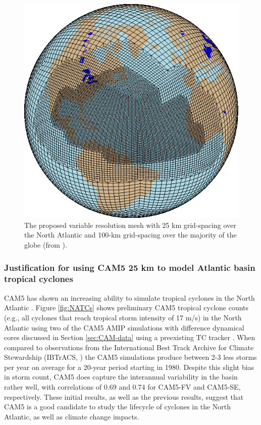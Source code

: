 \documentclass[11pt]{article}
\begin{document}
\begin{figure}[h]
\begin{center}
\includegraphics[width=2.in]{NA_mesh.eps}
\end{center}
\caption{The proposed variable resolution mesh with 25 km grid-spacing over the North Atlantic and 100-km grid-spacing over the majority of the globe (from \citet{Zarzycki2014multidecadal}).} \label{fig:NA_mesh}
\end{figure}

\subsubsection{Justification for using CAM5 25 km to model Atlantic basin tropical cyclones}

CAM5 has shown an increasing ability to simulate tropical cyclones in the North Atlantic \citep{Bacmeister2014,Wehner2014,Reed2015b}.  Figure \ref{fig:NATCs} shows preliminary CAM5 tropical cyclone counts (e.g., all cyclones that reach tropical storm intensity of 17 m/s) in the North Atlantic using two of the CAM5 AMIP simulations with difference dynamical cores discussed in Section \ref{sec:CAM-data} using a preexisting TC tracker \citep{Zhao2009}. When compared to observations from the International Best Track Archive for Climate Stewardship (IBTrACS, \citet{Knapp2010}) the CAM5 simulations produce between 2-3 less storms per year on average for a 20-year period starting in 1980. Despite this slight bias in storm count, CAM5 does capture the interannual variability in the basin rather well, with correlations of 0.69 and 0.74 for CAM5-FV and CAM5-SE, respectively. These initial results, as well as the previous results, suggest that CAM5 is a good candidate to study the lifecycle of cyclones in the North Atlantic, as well as climate change impacts.
\end{document}
